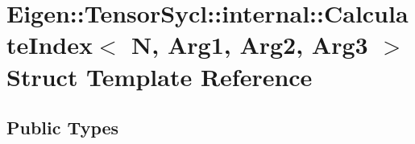 \hypertarget{struct_eigen_1_1_tensor_sycl_1_1internal_1_1_calculate_index_3_01_n_00_01_arg1_00_01_arg2_00_01_arg3_01_4}{}\section{Eigen\+:\+:Tensor\+Sycl\+:\+:internal\+:\+:Calculate\+Index$<$ N, Arg1, Arg2, Arg3 $>$ Struct Template Reference}
\label{struct_eigen_1_1_tensor_sycl_1_1internal_1_1_calculate_index_3_01_n_00_01_arg1_00_01_arg2_00_01_arg3_01_4}
\subsection*{Public Types}
